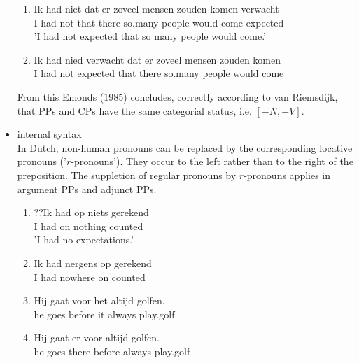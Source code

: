 \documentclass{article}
\begin{document}
\begin{itemize}
\begin{example}
\label{}
\begin{enumerate}
\item
   \gll *Ik had niet dat er zoveel mensen zouden komen verwacht\\
I had not that there so.many people would come expected\\
'I had not expected that so many people would come.'\\
\item
\gll Ik had nied verwacht dat er zoveel mensen zouden komen\\
I had not expected that there so.many people would come\\
   \glt
   \glend
   \end{enumerate}
      \end{example}
From this Emonds (1985) concludes, correctly according to van Riemsdijk, that PPs and CPs have the same categorial status, i.e. $[-N, -V]$.
\item internal syntax\\
In Dutch, non-human pronouns can be replaced by the corresponding locative pronouns ('$r$-pronouns'). They occur to the left rather than to the right of the preposition. The suppletion of regular pronouns by $r$-pronouns applies in argument PPs and adjunct PPs.
\begin{example}
\label{}
\begin{enumerate}
\item
   \gll ??Ik had op niets gerekend\\
I had on nothing counted\\
'I had no expectations.'\\
\item
\gll Ik had nergens op gerekend\\
I had nowhere on counted\\
\item
\gll *Hij gaat voor het altijd golfen.\\
he goes before it always play.golf\\

\item
\gll Hij gaat er voor altijd golfen.\\
he goes there before always play.golf\\


\end{enumerate}
\end{example}
\end{itemize}
\end{document}

